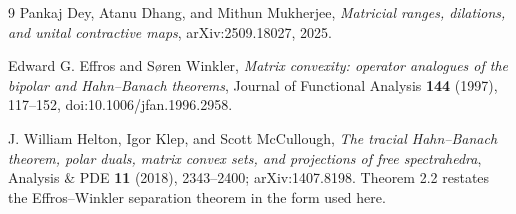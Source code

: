 \documentclass[11pt]{article}
\begin{document}
\begin{thebibliography}{9}
Pankaj Dey, Atanu Dhang, and Mithun Mukherjee,
\emph{Matricial ranges, dilations, and unital contractive maps},
arXiv:2509.18027, 2025.

Edward G. Effros and S\o ren Winkler,
\emph{Matrix convexity: operator analogues of the bipolar and Hahn--Banach
theorems}, Journal of Functional Analysis \textbf{144} (1997), 117--152,
doi:10.1006/jfan.1996.2958.

J. William Helton, Igor Klep, and Scott McCullough,
\emph{The tracial Hahn--Banach theorem, polar duals, matrix convex sets, and
projections of free spectrahedra}, Analysis \& PDE \textbf{11} (2018),
2343--2400; arXiv:1407.8198. Theorem 2.2 restates the Effros--Winkler
separation theorem in the form used here.
\end{thebibliography}
\end{document}

